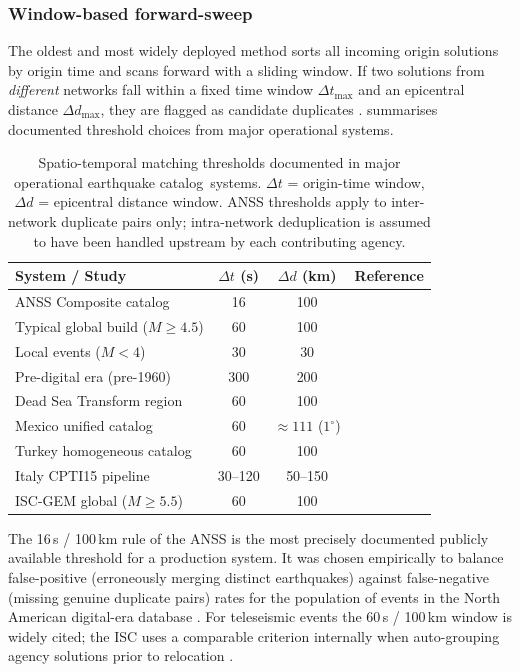 \documentclass[12pt]{article}
\newcommand{\catalog}{catalog}
\begin{document}
\subsubsection{Window-based forward-sweep}
\label{sec:forwardsweep}

The oldest and most widely deployed method sorts all incoming origin solutions by
origin time and scans forward with a sliding window.  If two solutions from
\emph{different} networks fall within a fixed time window $\Delta t_{\max}$ and
an epicentral distance $\Delta d_{\max}$, they are flagged as candidate
duplicates \citep{NCEDCComCat, Woessner2005}.   summarises
documented threshold choices from major operational systems.

\begin{table}[H]
  \centering
  \caption{Spatio-temporal matching thresholds documented in major operational
           earthquake \catalog\ systems.  $\Delta t$ = origin-time window,
           $\Delta d$ = epicentral distance window.  ANSS thresholds apply to
           inter-network duplicate pairs only; intra-network deduplication is
           assumed to have been handled upstream by each contributing agency.}
  \label{tab:windows}
  \begin{tabular}{p{4.3cm}ccp{3.1cm}}
    \toprule
    System / Study & $\Delta t$ (s) & $\Delta d$ (km) & Reference \\
    \midrule
    ANSS Composite \catalog & 16 & 100 & \citet{NCEDCComCat} \\
    Typical global build ($M \geq 4.5$) & 60 & 100 & \citet{Storchak2013} \\
    Local events ($M < 4$) & 30 & 30 & \citet{Woessner2005} \\
    Pre-digital era (pre-1960) & 300 & 200 & \citet{Bondar2011} \\
    Dead Sea Transform region & 60 & 100 & \citet{DeadSea2022} \\
    Mexico unified \catalog & 60 & $\approx 111$ ($1^\circ$) & \citet{Zuniga2019} \\
    Turkey homogeneous \catalog & 60 & 100 & \citet{Tan2021} \\
    Italy CPTI15 pipeline & 30--120 & 50--150 & \citet{CPTI15} \\
    ISC-GEM global ($M \geq 5.5$) & 60 & 100 & \citet{ISCGEM2018} \\
    \bottomrule
  \end{tabular}
\end{table}

The 16\,s / 100\,km rule of the ANSS is the most precisely documented publicly
available threshold for a production system.  It was chosen empirically to
balance false-positive (erroneously merging distinct earthquakes) against
false-negative (missing genuine duplicate pairs) rates for the population of
events in the North American digital-era database \citep{NCEDCComCat}.  For
teleseismic events the 60\,s / 100\,km window is widely cited; the ISC uses a
comparable criterion internally when auto-grouping agency solutions prior to
relocation \citep{ISCBulletinRebuild2020}.
\end{document}
